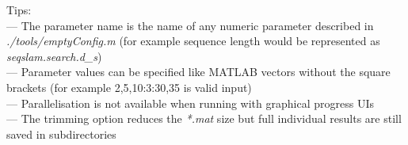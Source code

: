 \parbox{\textwidth}{Tips: \\ --- The parameter name is the name of any numeric parameter described in \textit{./tools/emptyConfig.m} (for example sequence length would be represented as \textit{seqslam.search.d\_s}) \\ --- Parameter values can be specified like MATLAB vectors without the square brackets (for example 2,5,10:3:30,35 is valid input) \\ --- Parallelisation is not available when running with graphical progress UIs \\ --- The trimming option reduces the \textit{*.mat} size but full individual results are still saved in subdirectories}
\smallskip
